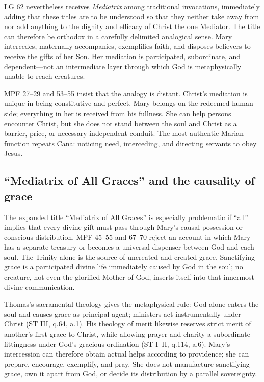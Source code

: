 LG 62 nevertheless receives \emph{Mediatrix} among traditional invocations, immediately adding that these titles are to be understood so that they neither take away from nor add anything to the dignity and efficacy of Christ the one Mediator. The title can therefore be orthodox in a carefully delimited analogical sense. Mary intercedes, maternally accompanies, exemplifies faith, and disposes believers to receive the gifts of her Son. Her mediation is participated, subordinate, and dependent---not an intermediate layer through which God is metaphysically unable to reach creatures.

MPF 27--29 and 53--55 insist that the analogy is distant. Christ's mediation is unique in being constitutive and perfect. Mary belongs on the redeemed human side; everything in her is received from his fullness. She can help persons encounter Christ, but she does not stand between the soul and Christ as a barrier, price, or necessary independent conduit. The most authentic Marian function repeats Cana: noticing need, interceding, and directing servants to obey Jesus.

\subsection{``Mediatrix of All Graces'' and the causality of grace}

The expanded title ``Mediatrix of All Graces'' is especially problematic if ``all'' implies that every divine gift must pass through Mary's causal possession or conscious distribution. MPF 45--55 and 67--70 reject an account in which Mary has a separate treasury or becomes a universal dispenser between God and each soul. The Trinity alone is the source of uncreated and created grace. Sanctifying grace is a participated divine life immediately caused by God in the soul; no creature, not even the glorified Mother of God, inserts itself into that innermost divine communication.

Thomas's sacramental theology gives the metaphysical rule: God alone enters the soul and causes grace as principal agent; ministers act instrumentally under Christ (ST III, q.64, a.1). His theology of merit likewise reserves strict merit of another's first grace to Christ, while allowing prayer and charity a subordinate fittingness under God's gracious ordination (ST I--II, q.114, a.6). Mary's intercession can therefore obtain actual helps according to providence; she can prepare, encourage, exemplify, and pray. She does not manufacture sanctifying grace, own it apart from God, or decide its distribution by a parallel sovereignty.

